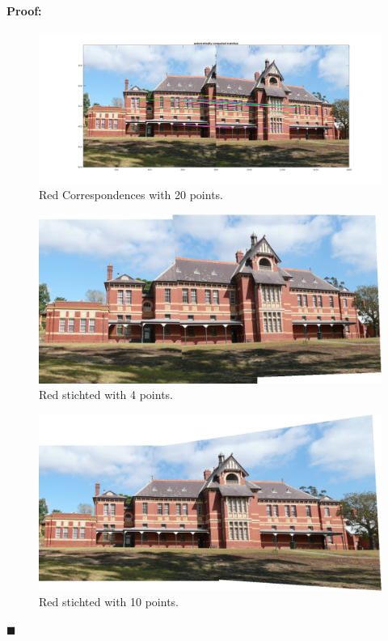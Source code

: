 \documentclass[12pt]{article}
\newenvironment{proof}{\paragraph{Proof: }}{\hfill$\blacksquare$}
\begin{document}
\begin{proof}
\begin{enumerate}
\begin{figure}[H]
\begin{center}
\advance\leftskip-3cm
\advance\rightskip-3cm
\includegraphics[keepaspectratio=true, scale = 0.3]{red_showcorrespondences_20.png}
\caption{Red Correspondences with 20 points.}
\label{visina8}
\end{center}
\end{figure}

\begin{figure}[H]
\begin{center}
\advance\leftskip-3cm
\advance\rightskip-3cm
\includegraphics[keepaspectratio=true, scale = 0.5]{red_stitched1_4.png}
\caption{Red stichted with 4 points.}
\label{visina8}
\end{center}
\end{figure}

\begin{figure}[H]
\begin{center}
\advance\leftskip-3cm
\advance\rightskip-3cm
\includegraphics[keepaspectratio=true, scale = 0.5]{red_stitched1_10.png}
\caption{Red stichted with 10 points.}
\label{visina8}
\end{center}
\end{figure}


\end{enumerate}
\end{proof}
\end{document}
